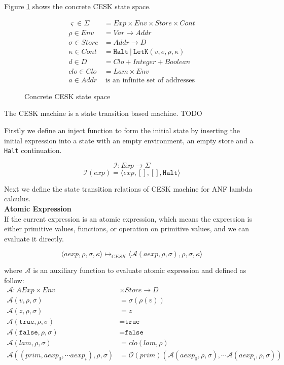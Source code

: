 \documentclass[paper=a4, fontsize=11pt]{scrartcl} %
\numberwithin{equation}{section} %
\numberwithin{figure}{section} %
\numberwithin{table}{section} %
\begin{document}
Figure \ref{fig:concretecesk} shows the concrete CESK state space.

\begin{figure}[h!]
\begin{align*}
\varsigma \in \Sigma & = Exp \times Env \times Store \times Cont \\
\rho \in Env & = Var \rightarrow Addr \\
\sigma \in Store & = Addr \rightarrow D \\
\kappa \in Cont & = \texttt{Halt} ~|~ \texttt{LetK}(v,e,\rho,\kappa) \\
d \in D & = Clo + Integer + Boolean \\
clo \in Clo & = Lam \times Env \\
a \in Addr & ~ \mbox{is an infinite set of addresses}
\end{align*}
\caption{Concrete CESK state space}
\label{fig:concretecesk}
\end{figure}

The CESK machine is a state transition based machine.  TODO

Firstly we define an inject function to form the initial state by inserting the initial expression into a state with an empty environment, an empty store and a \texttt{Halt} continuation.

$$ \mathcal{I} : Exp \rightarrow \Sigma $$
$$ \mathcal{I}(exp) = \langle exp, [], [], \texttt{Halt} \rangle $$

Next we define the state transition relations of CESK machine for ANF lambda calculus. \\

\textbf{Atomic Expression}\\
If the current expression is an atomic expression, which means the expression is either primitive values, functions, or operation on primitive values, and we can evaluate it directly.

$$ \langle aexp, \rho, \sigma, \kappa \rangle \longmapsto_{CESK} \langle \mathcal{A}(aexp, \rho, \sigma), \rho, \sigma, \kappa \rangle $$

where $\mathcal{A}$ is an auxiliary function to evaluate atomic expression and defined as follow:
\begin{align*}
\mathcal{A} : AExp \times Env & \times Store \rightarrow D \\
\mathcal{A}(v, \rho, \sigma) & = \sigma(\rho(v)) \\
\mathcal{A}(z, \rho, \sigma) & = z \\
\mathcal{A}(\texttt{true}, \rho, \sigma) & = \texttt{true} \\
\mathcal{A}(\texttt{false}, \rho, \sigma) & = \texttt{false} \\
\mathcal{A}(lam, \rho, \sigma) & = clo(lam, \rho)  \\
\mathcal{A}((prim, aexp_0, \cdots aexp_i), \rho, \sigma) & = \mathcal{O}(prim)(\mathcal{A}(aexp_0, \rho, \sigma), \cdots \mathcal{A}(aexp_i, \rho, \sigma))
\end{align*}
\end{document}
